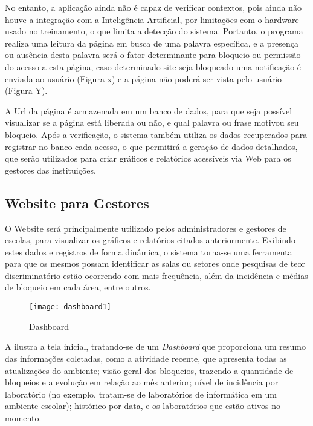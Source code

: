 No entanto, a aplicação ainda não é capaz de verificar contextos, pois ainda não houve a integração com a Inteligência Artificial, por limitações com o hardware usado no treinamento, o que limita a detecção do sistema. Portanto, o programa realiza uma leitura da página em busca de uma palavra específica, e a presença ou ausência desta palavra será o fator determinante para bloqueio ou permissão do acesso a esta página, caso determinado site seja bloqueado uma notificação é enviada ao usuário (Figura x) e a página não poderá ser vista pelo usuário (Figura Y). 

A Url da página é armazenada em um banco de dados, para que seja possível visualizar se a página está liberada ou não, e qual palavra ou frase motivou seu bloqueio.
Após a verificação, o sistema também utiliza os dados recuperados para registrar no banco cada acesso, o que permitirá a geração de dados detalhados, que serão utilizados para criar gráficos e relatórios acessíveis via Web para os gestores das instituições.

\subsection*{Website para Gestores}

O Website será principalmente utilizado pelos administradores e gestores de escolas, para visualizar os gráficos e relatórios citados anteriormente. Exibindo estes dados e registros de forma dinâmica, o sistema torna-se uma ferramenta para que os mesmos possam identificar as salas ou setores onde pesquisas de teor discriminatório estão ocorrendo com mais frequência, além da incidência e médias de bloqueio em cada área, entre outros.

\begin{figure}[H]
    \centering
    \caption{Dashboard}%
    \label{fig:dashboard}
    \texttt{[image: dashboard1]}
    \end{figure}

    
    A  ilustra a tela inicial, tratando-se de um \textit{Dashboard} que proporciona um resumo das informações coletadas, como a atividade recente, que apresenta todas as atualizações do ambiente; visão geral dos bloqueios, trazendo a quantidade de bloqueios e a evolução em relação ao mês anterior; nível de incidência por laboratório (no exemplo, tratam-se de laboratórios de informática em um ambiente escolar); histórico por data, e os laboratórios que estão ativos no momento.


